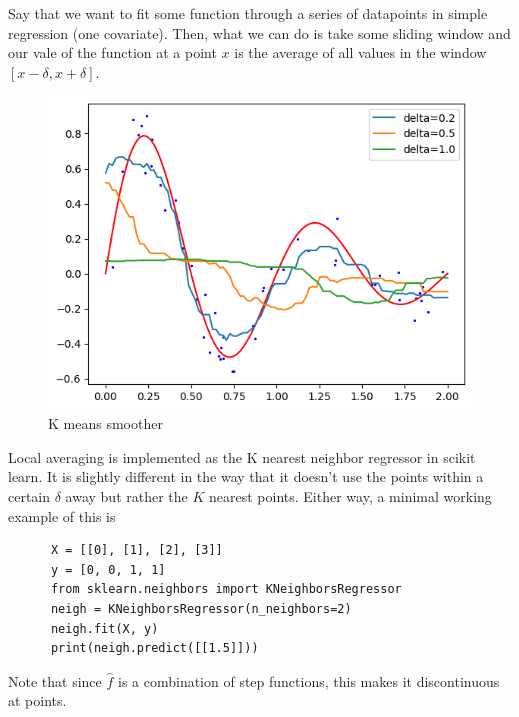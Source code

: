   \begin{example}
    Say that we want to fit some function through a series of datapoints in simple regression (one covariate). Then, what we can do is take some sliding window and our vale of the function at a point $x$ is the average of all values in the window $[x - \delta, x + \delta]$. 
    \begin{figure}[H]
      \centering 
      \includegraphics[scale=0.6]{img/kmeans_smoother.png}
      \caption{K means smoother} 
      \label{fig:kmeans_smoother}
    \end{figure}
  \end{example}

  \begin{code}
    Local averaging is implemented as the K nearest neighbor regressor in scikit learn. It is slightly different in the way that it doesn't use the points within a certain $\delta$ away but rather the $K$ nearest points. Either way, a minimal working example of this is 
    \begin{lstlisting}
      X = [[0], [1], [2], [3]]
      y = [0, 0, 1, 1]
      from sklearn.neighbors import KNeighborsRegressor
      neigh = KNeighborsRegressor(n_neighbors=2)
      neigh.fit(X, y)
      print(neigh.predict([[1.5]])) 
    \end{lstlisting}
  \end{code}

  Note that since $\hat{f}$ is a combination of step functions, this makes it discontinuous at points. 

